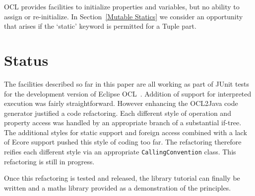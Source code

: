 \documentclass[sigconf]{acmart}
\begin{document}


OCL provides facilities to initialize properties and variables, but no ability to assign or re-initialize. In Section~\ref{Mutable Statics} we consider an opportunity that arises if the `static' keyword is permitted for a Tuple part. 
 
\section{Status}\label{Status}

The facilities described so far in this paper are all working as part of JUnit tests for the development version of Eclipse OCL~\cite{Eclipse-OCL}. Addition of support for interpreted execution was fairly straightforward. However enhancing the OCL2Java code generator justified a code refactoring. Each different style of operation and property access was handled by an appropriate branch of a substantial if-tree. The additional styles for static support and foreign access combined with a lack of Ecore support pushed this style of coding too far. The refactoring therefore reifies each different style via an appropriate \verb|CallingConvention| class. This refactoring is still in progress.

Once this refactoring is tested and released, the library tutorial can finally be written and a maths library provided as a demonstration of the principles.
 
\end{document}
